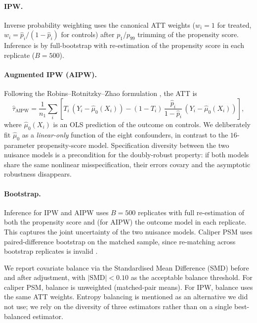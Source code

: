\documentclass[11pt,a4paper]{article}
\begin{document}
\paragraph{IPW.} Inverse probability weighting uses the canonical ATT
weights ($w_i = 1$ for treated, $w_i = \hat{p}_i / (1-\hat{p}_i)$ for
controls) after $p_1$/$p_{99}$ trimming of the propensity score.
Inference is by full-bootstrap with re-estimation of the propensity
score in each replicate ($B=500$).

\paragraph{Augmented IPW (AIPW).} Following the
Robins--Rotnitzky--Zhao formulation \citep{robins1995}, the ATT is
\begin{equation}
\hat{\tau}_{\text{AIPW}} = \frac{1}{n_1} \sum_{i} \left[ T_i \,
(Y_i - \hat{\mu}_0(X_i)) - (1 - T_i) \, \frac{\hat{p}_i}{1 - \hat{p}_i}
\, (Y_i - \hat{\mu}_0(X_i)) \right],
\end{equation}
where $\hat{\mu}_0(X_i)$ is an OLS prediction of the outcome on
controls. We deliberately fit $\hat{\mu}_0$ as a \emph{linear-only}
function of the eight confounders, in contrast to the $16$-parameter
propensity-score model. Specification diversity between the two
nuisance models is a precondition for the doubly-robust property: if
both models share the same nonlinear misspecification, their errors
covary and the asymptotic robustness disappears.

\paragraph{Bootstrap.} Inference for IPW and AIPW uses
$B=500$ replicates with full re-estimation of both the propensity
score and (for AIPW) the outcome model in each replicate. This
captures the joint uncertainty of the two nuisance models. Caliper
PSM uses paired-difference bootstrap on the matched sample, since
re-matching across bootstrap replicates is invalid
\citep{abadie2008}.

We report covariate balance via the Standardised Mean Difference
(SMD) before and after adjustment, with $|\text{SMD}| < 0.10$ as the
acceptable balance threshold. For caliper PSM, balance is unweighted
(matched-pair means). For IPW, balance uses the same ATT weights.
Entropy balancing \citep{hainmueller2012} is mentioned as an
alternative we did not use; we rely on the diversity of three
estimators rather than on a single best-balanced estimator.
\end{document}
